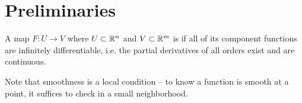 \setcounter{section}{-1}
%
\section{Preliminaries}
\begin{defn}
	A map $F : U \to V$ where $U \subset \mathbb{R}^n$ and $V \subset \mathbb{R}^m$ is  if all of its
	component functions are infinitely differentiable, i.e. the partial derivatives of all orders
	exist and are continuous.
\end{defn}
%
Note that smoothness is a local condition -- to know a function is smooth at a point, it suffices to check
in a small neighborhood.
